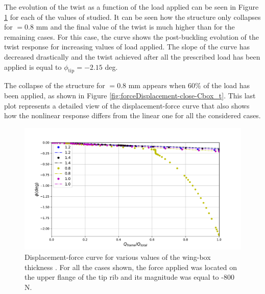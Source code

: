     The evolution of the twist as a function of the load applied can be seen in Figure \ref{fig:forceDisplacement-far-Cbox_t} for each of the values of \boxt studied. It can be seen how the structure only collapses for \boxt$= 0.8$ mm and the final value of the twist is much higher than for the remaining cases. For this case, the curve shows the post-buckling evolution of the twist response for increasing values of load applied. The slope of the curve has decreased drastically and the twist achieved after all the prescribed load has been applied is equal to $\phi_{\mathrm{tip}} = -2.15$ deg.

    The collapse of the structure for \boxt$= 0.8$ mm appears when 60\% of the load has been applied, as shown in Figure \ref{fig:forceDisplacement-close-Cbox_t}. This last plot represents a detailed view of the displacement-force curve that also shows how the nonlinear response differs from the linear one for all the considered cases.

    \begin{figure}[!htpb] %
      \centering
      \includegraphics[width=0.8 \textwidth]{../figures/result-sim/cbox/force_displacement-far}
      \caption[Displacement-force curve for various values of the wing-box thickness]{Displacement-force curve for various values of the wing-box thickness \boxt. For all the cases shown, the force applied was located on the upper flange of the tip rib and its magnitude was equal to -800 N.}\label{fig:forceDisplacement-far-Cbox_t}
    \end{figure}

